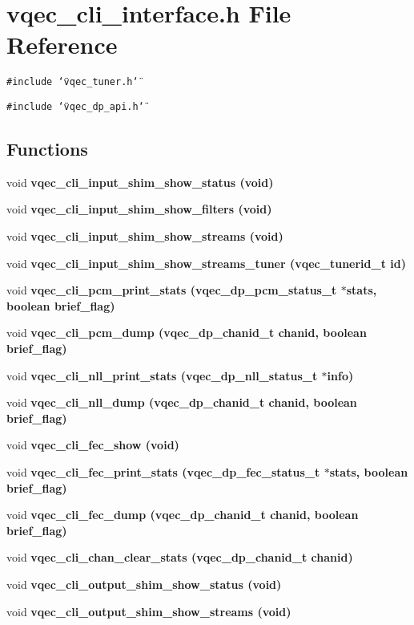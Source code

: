 \section{vqec\_\-cli\_\-interface.h File Reference}
\label{vqec__cli__interface_8h}
{\tt \#include \char`\"{}vqec\_\-tuner.h\char`\"{}}\par
{\tt \#include \char`\"{}vqec\_\-dp\_\-api.h\char`\"{}}\par
\subsection*{Functions}
\begin{CompactItemize}
\item 
void \bf{vqec\_\-cli\_\-input\_\-shim\_\-show\_\-status} (void)
\item 
void \bf{vqec\_\-cli\_\-input\_\-shim\_\-show\_\-filters} (void)
\item 
void \bf{vqec\_\-cli\_\-input\_\-shim\_\-show\_\-streams} (void)
\item 
void \bf{vqec\_\-cli\_\-input\_\-shim\_\-show\_\-streams\_\-tuner} (vqec\_\-tunerid\_\-t id)
\item 
void \bf{vqec\_\-cli\_\-pcm\_\-print\_\-stats} (vqec\_\-dp\_\-pcm\_\-status\_\-t $\ast$stats, boolean brief\_\-flag)
\item 
void \bf{vqec\_\-cli\_\-pcm\_\-dump} (vqec\_\-dp\_\-chanid\_\-t chanid, boolean brief\_\-flag)
\item 
void \bf{vqec\_\-cli\_\-nll\_\-print\_\-stats} (vqec\_\-dp\_\-nll\_\-status\_\-t $\ast$info)
\item 
void \bf{vqec\_\-cli\_\-nll\_\-dump} (vqec\_\-dp\_\-chanid\_\-t chanid, boolean brief\_\-flag)
\item 
void \bf{vqec\_\-cli\_\-fec\_\-show} (void)
\item 
void \bf{vqec\_\-cli\_\-fec\_\-print\_\-stats} (vqec\_\-dp\_\-fec\_\-status\_\-t $\ast$stats, boolean brief\_\-flag)
\item 
void \bf{vqec\_\-cli\_\-fec\_\-dump} (vqec\_\-dp\_\-chanid\_\-t chanid, boolean brief\_\-flag)
\item 
void \bf{vqec\_\-cli\_\-chan\_\-clear\_\-stats} (vqec\_\-dp\_\-chanid\_\-t chanid)
\item 
void \bf{vqec\_\-cli\_\-output\_\-shim\_\-show\_\-status} (void)
\item 
void \bf{vqec\_\-cli\_\-output\_\-shim\_\-show\_\-streams} (void)
\item 

\end{CompactItemize}
